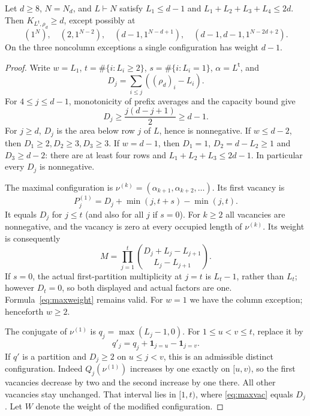 \documentclass[11pt]{article}
\theoremstyle{remark}\newtheorem{remark}[theorem]{Remark}
\newcommand{\trp}{\mathsf t}\newcommand{\eps}{\varepsilon}
\numberwithin{equation}{section}\setlength{\emergencystretch}{2em}
\begin{document}
\begin{lemma}\label{lem:low}
Let $d\ge8$, $N=N_d$, and $L\vdash N$ satisfy
$L_1\le d-1$ and $L_1+L_2+L_3+L_4\le2d$.
Then $K_{L^{\trp},\rho_d}\ge d$, except possibly at
\begin{equation}\label{eq:lowexceptions}
 (1^N),\quad (2,1^{N-2}),\quad
 (d-1,1^{N-d+1}),\quad(d-1,d-1,1^{N-2d+2}).
\end{equation}
On the three noncolumn exceptions a single configuration has weight $d-1$.
\end{lemma}
\begin{proof}
Write $w=L_1$, $t=\#\{i:L_i\ge2\}$, $s=\#\{i:L_i=1\}$,
$\alpha=L^{\trp}$, and
\[
 D_j=\sum_{i\le j}((\rho_d)_i-L_i).
\]
For $4\le j\le d-1$, monotonicity of prefix averages and the capacity bound give
\begin{equation}\label{eq:Dmiddle}
 D_j\ge\frac{j(d-j+1)}2\ge d-1.
\end{equation}
For $j\ge d$, $D_j$ is the area below row $j$ of $L$, hence is
nonnegative. If $w\le d-2$, then $D_1\ge2,D_2\ge3,D_3\ge3$.
If $w=d-1$, then $D_1=1$, $D_2=d-L_2\ge1$ and $D_3\ge d-2$:
there are at least four rows and $L_1+L_2+L_3\le2d-1$.
In particular every $D_j$ is nonnegative.

The maximal configuration is
$\nu^{(k)}=(\alpha_{k+1},\alpha_{k+2},\ldots)$.
Its first vacancy is
\begin{equation}\label{eq:maxvac}
 P_j^{(1)}=D_j+\min(j,t+s)-\min(j,t).
\end{equation}
It equals $D_j$ for $j\le t$ (and also for all $j$ if $s=0$).
For $k\ge2$ all vacancies are nonnegative, and the vacancy is zero
at every occupied length of $\nu^{(k)}$. Its weight is consequently
\begin{equation}\label{eq:maxweight}
 M=\prod_{j=1}^{t}
    \binom{D_j+L_j-L_{j+1}}{L_j-L_{j+1}}.
\end{equation}
If $s=0$, the actual first-partition multiplicity at $j=t$ is
$L_t-1$, rather than $L_t$; however $D_t=0$, so both displayed and
actual factors are one. Formula~\eqref{eq:maxweight} remains valid.
For $w=1$ we have the column exception; henceforth $w\ge2$.

The conjugate of $\nu^{(1)}$ is $q_j=\max(L_j-1,0)$.
For $1\le u<v\le t$, replace it by
\begin{equation}\label{eq:move}
 q'_j=q_j+\mathbf1_{j=u}-\mathbf1_{j=v}.
\end{equation}
If $q'$ is a partition and $D_j\ge2$ on $u\le j<v$, this is an
admissible distinct configuration. Indeed $Q_j(\nu^{(1)})$ increases
by one exactly on $[u,v)$, so the first vacancies decrease by two
and the second increase by one there. All other vacancies stay unchanged.
That interval lies in $[1,t)$, where \eqref{eq:maxvac} equals $D_j$.
Let $W$ denote the weight of the modified configuration.


\end{proof}
\end{document}
